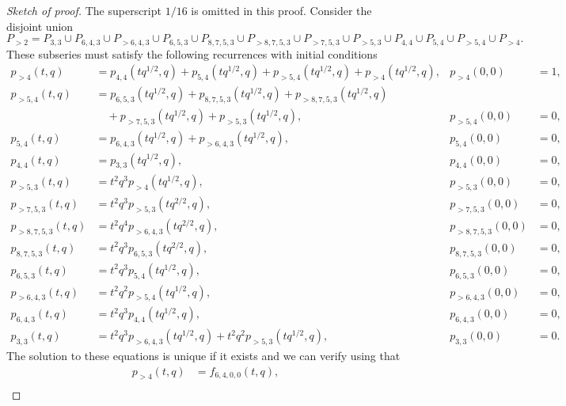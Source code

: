 \documentclass[a4paper, 12pt, reqno]{amsart}
\theoremstyle{remark}
\numberwithin{equation}{subsection}
\begin{document}
\begin{proof}[Sketch of proof]
  The superscript $1/16$ is omitted in this proof.
  Consider the disjoint union
  \begin{equation*}
    P_{>2} = P_{3, 3} \cup P_{6, 4, 3} \cup P_{>6, 4, 3} \cup P_{6, 5, 3} \cup P_{8, 7, 5, 3} \cup P_{>8, 7, 5, 3} \cup P_{>7, 5, 3} \cup P_{>5, 3} \cup P_{4, 4} \cup P_{5, 4} \cup P_{>5, 4} \cup P_{>4}.
  \end{equation*}
  These subseries must satisfy the following recurrences with initial conditions
  \begin{align*}
    p_{>4}(t, q) &= p_{4, 4} (tq^{1/2}, q) + p_{5, 4}(tq^{1/2}, q) + p_{>5, 4}(tq^{1/2}, q) + p_{>4}(tq^{1/2}, q), &p_{>4}(0, 0) &= 1, \\
    p_{>5, 4}(t, q) &= p_{6, 5, 3}(tq^{1/2}, q) + p_{8, 7, 5, 3}(tq^{1/2}, q) + p_{>8, 7, 5, 3}(tq^{1/2}, q) \\
    &\quad + p_{>7, 5, 3}(tq^{1/2}, q) + p_{>5, 3}(tq^{1/2}, q), &p_{>5, 4}(0, 0) &= 0, \\
    p_{5, 4}(t, q) &= p_{6, 4, 3}(tq^{1/2}, q) + p_{>6, 4, 3}(tq^{1/2}, q), &p_{5, 4}(0, 0) &= 0, \\
    p_{4, 4}(t, q) &= p_{3, 3}(tq^{1/2}, q), &p_{4, 4}(0, 0) &= 0, \\
    p_{>5, 3}(t, q) &= t^2q^3p_{>4}(tq^{1/2}, q), &p_{>5, 3}(0, 0) &= 0, \\
    p_{>7, 5, 3}(t, q) &= t^2q^3p_{>5, 3}(tq^{2/2}, q), &p_{>7, 5, 3}(0, 0) &= 0, \\
    p_{>8, 7, 5, 3}(t, q) &= t^2q^4p_{>6, 4, 3}(tq^{2/2}, q), &p_{>8, 7, 5, 3}(0, 0) &= 0, \\
    p_{8, 7, 5, 3}(t, q) &= t^2q^3p_{6, 5, 3}(tq^{2/2}, q), &p_{8, 7, 5, 3}(0, 0) &= 0, \\
    p_{6, 5, 3}(t, q) &= t^2q^3p_{5, 4}(tq^{1/2}, q), &p_{6, 5, 3}(0, 0) &= 0, \\
    p_{>6, 4, 3}(t, q) &= t^2q^2p_{>5, 4}(tq^{1/2}, q), &p_{>6, 4, 3}(0, 0) &= 0, \\
    p_{6, 4, 3}(t, q) &= t^2q^3p_{4, 4}(tq^{1/2}, q), &p_{6, 4, 3}(0, 0) &= 0, \\
    p_{3, 3}(t, q) &= t^2q^3p_{>6, 4, 3}(tq^{1/2}, q) + t^2q^2p_{>5, 3}(tq^{1/2}, q), &p_{3, 3}(0, 0) &= 0.
  \end{align*}
  The solution to these equations is unique if it exists and we can verify using  that
  \begin{align*}
    p_{>4}(t, q) &= f_{6, 4, 0, 0}(t, q), \\

\end{align*}
\end{proof}
\end{document}
